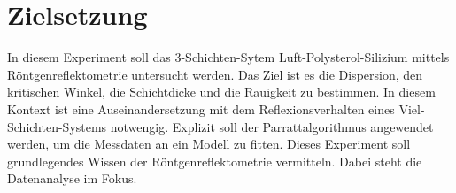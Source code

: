 \chapter{Zielsetzung}
\label{cha:zielsetzung}

In diesem Experiment soll das 3-Schichten-Sytem Luft-Polysterol-Silizium mittels Röntgenreflektometrie untersucht werden. Das Ziel ist es die Dispersion, den kritischen Winkel, 
die Schichtdicke und die Rauigkeit zu bestimmen. In diesem Kontext ist eine Auseinandersetzung mit dem Reflexionsverhalten eines Viel-Schichten-Systems notwengig. Explizit soll der Parrattalgorithmus 
angewendet werden, um die Messdaten an ein Modell zu fitten. Dieses Experiment soll grundlegendes Wissen der Röntgenreflektometrie vermitteln. Dabei steht die Datenanalyse im Fokus.